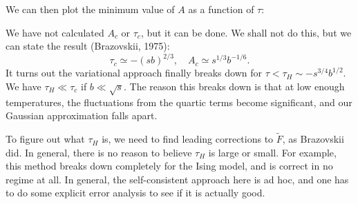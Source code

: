 \documentclass[a4paper]{article}
\begin{document}
We can then plot the minimum value of $A$ as a function of $\tau$:
\begin{center}
\end{center}
We have not calculated $A_c$ or $\tau_c$, but it can be done. We shall not do this, but we can state the result (Brazovskii, 1975):
\[
  \tau_c \simeq -(sb)^{2/3},\quad A_c \simeq s^{1/3} b^{-1/6}.
\]
It turns out the variational approach finally breaks down for $\tau < \tau_H \sim -s^{3/4} b^{1/2}$. We have $\tau_H \ll \tau_c$ if $b \ll \sqrt{s}$. The reason this breaks down is that at low enough temperatures, the fluctuations from the quartic terms become significant, and our Gaussian approximation falls apart.

To figure out what $\tau_H$ is, we need to find leading corrections to $\tilde{F}$, as Brazovskii did. In general, there is no reason to believe $\tau_H$ is large or small. For example, this method breaks down completely for the Ising model, and is correct in no regime at all. In general, the self-consistent approach here is ad hoc, and one has to do some explicit error analysis to see if it is actually good.

\end{document}
